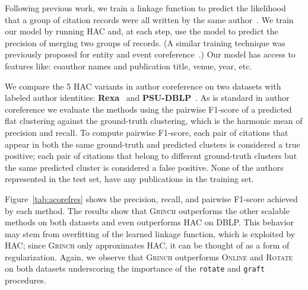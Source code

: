 \documentclass{article} \usepackage[utf8]{inputenc} \usepackage[T1]{fontenc}    \usepackage{hyperref}       \usepackage{url}            \usepackage{booktabs}       \usepackage{amsfonts}       \usepackage{nicefrac}       \usepackage{microtype}      \usepackage{geometry}
\newcommand{\alg}{\textsc{Grinch}\xspace}
\newcommand{\algrotate}{\textsc{Rotate}\xspace}
\newcommand{\hac}{\textsc{HAC}\xspace}
\newcommand{\greedy}{\textsc{Online}\xspace}
\newcommand{\graft}{\texttt{graft}\xspace}
\newcommand{\rotate}{\texttt{rotate}\xspace}
\newcommand{\hof}{linkage function\xspace}
\begin{document}
Following previous work, we train a \hof to predict the likelihood
that a group of citation records were all written by the same
author~\cite{culotta2007author, singh2011large,
  wick2012discriminative}.  We train our model by running \hac and, at
each step, use the model to predict the precision of merging two
groups of records. (A similar training technique was previously
proposed for entity and event coreference~\cite{lee2012joint}.) Our
model has access to features like: coauthor names and publication
title, venue, year, etc.

We compare the 5 \hac variants in author coreference on two datasets
with labeled author identities: \textbf{Rexa}~\cite{culotta2007author}
and \textbf{PSU-DBLP}~\cite{han2005name}.  As is standard in author
coreference we evaluate the methods using the pairwise F1-score of a
predicted flat clustering against the ground-truth clustering, which
is the harmonic mean of precision and recall.  To compute pairwise
F1-score, each pair of citations that appear in both the same
ground-truth and predicted clusters is considered a true positive; each
pair of citations that belong to different ground-truth clusters but
the same predicted cluster is considered a false positive. None of the
authors represented in the test set, have any publications in the
training set.

Figure~\ref{tab:acorefres} shows the precision, recall, and pairwise
F1-score achieved by each method. The results show that \alg
outperforms the other scalable methods on both datasets and even
outperforms \hac on DBLP. This behavior may stem from overfitting of
the learned \hof, which is exploited by \hac; since \alg only
approximates \hac, it can be thought of as a form of regularization.
Again, we observe that \alg outperforms \greedy and \algrotate on both
datasets underscoring the importance of the \rotate and \graft
procedures.
\end{document}
